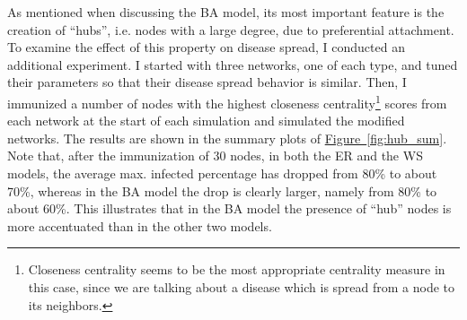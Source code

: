 \documentclass[11pt]{article} %
\newcommand{\figref}[1]{\mbox{Figure~\ref{#1}}}
\renewcommand{\figref}[1]{\hyperref[#1]{\mbox{Figure~\ref*{#1}}}}
\begin{document}
As mentioned when discussing the BA model, its most important feature
is the creation of ``hubs'', i.e. nodes with a large degree, due to
preferential attachment. To examine the effect of this property
on disease spread, I conducted an additional experiment. I started
with three networks, one of each type, and tuned their parameters
so that their disease spread behavior is similar. Then, I immunized
a number of nodes with the highest closeness
centrality\footnote{Closeness centrality seems to be the most appropriate
centrality measure in this case, since we are talking about a disease which
is spread from a node to its neighbors.}
scores from
each network at the start of each simulation and simulated
the modified networks. The results are shown in the summary plots of
\figref{fig:hub_sum}. Note that, after the immunization of 30 nodes,
in both the ER and the WS models, the average max. infected percentage
has dropped from 80\% to about 70\%, whereas in the BA model the
drop is clearly larger, namely from 80\% to about 60\%. This illustrates
that in the BA model the presence of ``hub'' nodes is more accentuated
than in the other two models.
\end{document}
